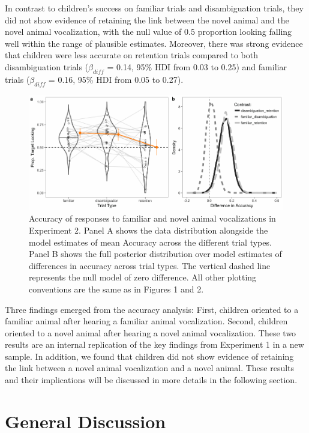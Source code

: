 \documentclass[english,floatsintext,man]{apa6}
\theoremstyle{definition}
\theoremstyle{definition}
\theoremstyle{definition}
\theoremstyle{remark}
\begin{document}
In contrast to children's success on familiar trials and disambiguation
trials, they did not show evidence of retaining the link between the
novel animal and the novel animal vocalization, with the null value of
\(0.5\) proportion looking falling well within the range of plausible
estimates. Moreover, there was strong evidence that children were less
accurate on retention trials compared to both disambiguation trials
(\(\beta_{diff}\) = 0.14, 95\% HDI from 0.03 to 0.25) and familiar
trials (\(\beta_{diff}\) = 0.16, 95\% HDI from 0.05 to 0.27).

\begin{figure}[tb]
\includegraphics[width=0.95\linewidth]{anime_manuscript_files/figure-latex/acc-plot-e2-1} \caption{Accuracy of responses to familiar and novel animal vocalizations in Experiment 2. Panel A shows the data distribution alongside the model estimates of mean Accuracy across the different trial types. Panel B shows the full posterior distribution over model estimates of differences in accuracy across trial types. The vertical dashed line represents the null model of zero difference. All other plotting conventions are the same as in Figures 1 and 2.}\label{fig:acc-plot-e2}
\end{figure}

Three findings emerged from the accuracy analysis: First, children
oriented to a familiar animal after hearing a familiar animal
vocalization. Second, children oriented to a novel animal after hearing
a novel animal vocalization. These two results are an internal
replication of the key findings from Experiment 1 in a new sample. In
addition, we found that children did not show evidence of retaining the
link between a novel animal vocalization and a novel animal. These
results and their implications will be discussed in more details in the
following section.

\hypertarget{general-discussion}{%
\section{General Discussion}\label{general-discussion}}
\end{document}
